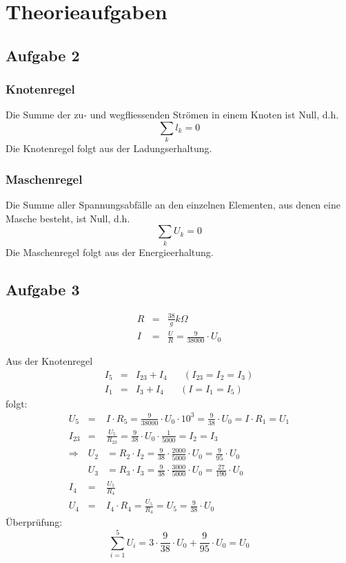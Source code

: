 \documentclass[12pt,a4paper]{article}
\begin{document}
\newpage
\section*{Theorieaufgaben}

\subsection*{Aufgabe 2}
\subsubsection*{Knotenregel}
Die Summe der zu- und wegfliessenden Str\"omen in einem Knoten ist Null, d.h.
\[ \sum_kl_k = 0 \]
Die Knotenregel folgt aus der Ladungserhaltung.

\subsubsection*{Maschenregel}
Die Summe aller Spannungsabf\"alle an den einzelnen Elementen, aus denen eine Masche besteht, ist Null, d.h.
\[ \sum_kU_k = 0\]
Die Maschenregel folgt aus der Energieerhaltung.

\subsection*{Aufgabe 3}
\begin{eqnarray*}
R & = & \frac{38}{g} k\Omega \\
I & = & \frac{U}{R} = \frac{9}{38000} \cdot U_0
\end{eqnarray*}

Aus der Knotenregel
\begin{eqnarray*}
I_5 & = & I_{23} + I_4 \hspace{20pt} ( I_{23} = I_2 = I_3 ) \\
I_1 & = & I_3 + I_4 \hspace{20pt} ( I = I_1 = I_5 )
\end{eqnarray*}
folgt:
\begin{eqnarray*}
U_5 & = & I \cdot R_5 = \frac{9}{38000} \cdot U_0 \cdot 10^3 = \frac{9}{38} \cdot U_0 = I \cdot R_1 = U_1 \\
I_{23} & = & \frac{U_5}{R_{23}} = \frac{9}{38} \cdot U_0 \cdot \frac{1}{5000} = I_2 = I_3 \\
\Rightarrow & U_2 & = R_2 \cdot I_2 = \frac{9}{38} \cdot \frac{2000}{5000} \cdot U_0 = \frac{9}{95} \cdot U_0 \\
& U_3 & = R_3 \cdot I_3 = \frac{9}{38} \cdot \frac{3000}{5000} \cdot U_0 = \frac{27}{190} \cdot U_0 \\
I_4 & = & \frac{U_5}{R_4} \\
U_4 & = & I_4 \cdot R_4 = \frac{U_5}{R_4} = U_5 = \frac{9}{38} \cdot U_0
\end{eqnarray*}
\"Uberpr\"ufung:
\[ \sum_{i=1}^5 U_i = 3 \cdot \frac{9}{38} \cdot U_0 + \frac{9}{95} \cdot U_0 = U_0 \]
\end{document}
